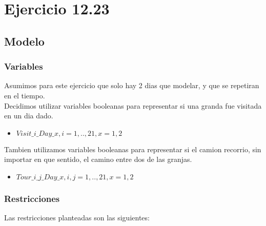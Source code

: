 \section{Ejercicio 12.23}
\subsection{Modelo}
\subsubsection{Variables}


Asumimos para este ejercicio que solo hay 2 dias que modelar, y que se repetiran en el tiempo. \\
Decidimos utilizar variables booleanas para representar si una granda fue visitada en un dia dado. \\ 

\begin{itemize}
\item $Visit\_i\_Day\_x,  i = 1, .. ,21, x = 1,2$ \\
\end{itemize}

Tambien utilizamos variables booleanas para representar si el camion recorrio, sin importar en que sentido, el camino entre dos de las granjas. \\

\begin{itemize}
\item $Tour\_i\_j\_Day\_x,  i,j = 1, .. ,21, x = 1,2$ \\
\end{itemize}

\subsubsection{Restricciones}

Las restricciones planteadas son las siguientes: \\

